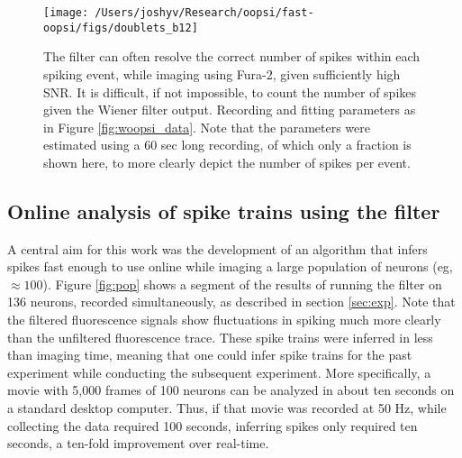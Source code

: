 \begin{figure}[h!]
\centering \texttt{[image: /Users/joshyv/Research/oopsi/fast-oopsi/figs/doublets\_b12]}
\caption[\foopsi filter outperforms Wiener filter on multi-spike events]{The \foopsi filter can often resolve the correct number of spikes within each spiking event, while imaging using Fura-2, given sufficiently high SNR.  It is difficult, if not impossible, to count the number of spikes given the Wiener filter output.  Recording and fitting parameters as in Figure \ref{fig:woopsi_data}. Note that the parameters were estimated using a 60 sec long recording, of which only a fraction is shown here, to more clearly depict the number of spikes per event.  } \label{fig:woopsi_data_doublets}
\end{figure}






\subsection{Online analysis of spike trains using the \foopsi filter}

A central aim for this work was the development of an algorithm that infers spikes fast enough to use online while imaging a large population of neurons (eg, $\approx 100$).  Figure \ref{fig:pop} shows a segment of the results of running the \foopsi filter on 136 neurons, recorded simultaneously, as described in section \ref{sec:exp}.  Note that the filtered fluorescence signals show fluctuations in spiking much more clearly than the unfiltered fluorescence trace. These spike trains were inferred in less than imaging time, meaning that one could infer spike trains for the past experiment while conducting the subsequent experiment. More specifically, a movie with 5,000 frames of 100 neurons can be analyzed in about ten seconds on a standard desktop computer.  Thus, if that movie was recorded at 50 Hz, while collecting the data required 100 seconds, inferring spikes only required ten seconds, a ten-fold improvement over real-time.  


